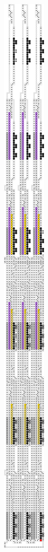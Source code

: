 \begin{figure}[H]
    \centering
    \begin{subfigure}[t]{0.3\textwidth}
        \centering
        \includegraphics[width=0.3\textwidth]{full_overview_case_3_colored}

\end{subfigure}
\end{figure}
